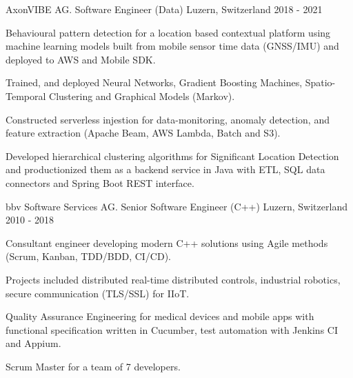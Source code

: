 

\begin{cventries}

  \cventry
    {AxonVIBE AG.} %
    {Software Engineer (Data)} %
    {Luzern, Switzerland} %
    {2018 - 2021} %
    {
      \begin{cvitems} %
        \item {
            Behavioural pattern detection for a location based contextual platform
            using machine learning models built from mobile sensor time data 
            (GNSS/IMU) and deployed to AWS and Mobile SDK.}
        \item {
            Trained, and deployed Neural Networks, Gradient Boosting Machines, Spatio-Temporal 
            Clustering and Graphical Models (Markov).}
        \item {
            Constructed serverless injestion for data-monitoring, anomaly detection, 
            and feature extraction (Apache Beam, AWS Lambda, Batch and S3).}
        \item {
            Developed hierarchical clustering algorithms for Significant Location Detection 
            and productionized them
            as a backend service in Java with ETL, SQL data connectors and Spring Boot REST interface.}
      \end{cvitems}
    }

\cventry
{bbv Software Services AG.} %
{Senior Software Engineer (C++)} %
{Luzern, Switzerland} %
{2010 - 2018} %
{
  \begin{cvitems} %
    \item {
        Consultant engineer developing modern C++ solutions using 
        Agile methods (Scrum, Kanban, TDD/BDD, CI/CD).}
      \item{
        Projects included distributed real-time distributed
        controls, industrial robotics, secure communication (TLS/SSL)
        for IIoT.}
    \item {
        Quality Assurance Engineering for medical devices and mobile apps
        with functional specification written in Cucumber, 
        test automation with Jenkins CI and Appium. 
        }
    \item {
        Scrum Master for a team of 7 developers.
        }
  \end{cvitems}
}


\end{cventries}

